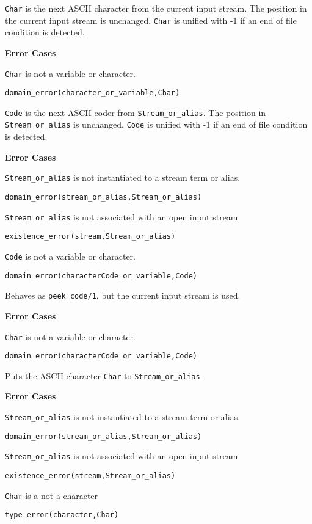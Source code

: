 \begin{description}
{\tt Char} is the next ASCII character from the current input stream.
The position in the current input stream is unchanged.  {\tt Char} is
unified with -1 if an end of file condition is detected.

{\bf Error Cases}
\bi
\item 	{\tt Char} is not a variable or character.
\bi
\item 	{\tt domain\_error(character\_or\_variable,Char)}
\ei
\ei

{\tt Code} is the next ASCII coder from {\tt Stream\_or\_alias}.
The position in {\tt Stream\_or\_alias} is unchanged.  {\tt Code} is
unified with -1 if an end of file condition is detected.

{\bf Error Cases}
\bi
\item 	{\tt Stream\_or\_alias} is not instantiated to a stream term or alias.
\bi
\item 	{\tt domain\_error(stream\_or\_alias,Stream\_or\_alias)}
\ei
\item 	{\tt Stream\_or\_alias} is not associated with an open input stream
\bi
\item 	{\tt existence\_error(stream,Stream\_or\_alias)}
\ei
\item 	{\tt Code} is not a variable or character.
\bi
\item 	{\tt domain\_error(characterCode\_or\_variable,Code)}
\ei
\ei

Behaves as {\tt peek\_code/1}, but the current input stream is used.

{\bf Error Cases}
\bi
\item 	{\tt Char} is not a variable or character.
\bi
\item 	{\tt domain\_error(characterCode\_or\_variable,Code)}
\ei
\ei


Puts the ASCII character {\tt Char} to {\tt Stream\_or\_alias}.

{\bf Error Cases}
\bi
\item 	{\tt Stream\_or\_alias} is not instantiated to a stream term or alias.
\bi
\item 	{\tt domain\_error(stream\_or\_alias,Stream\_or\_alias)}
\ei
\item 	{\tt Stream\_or\_alias} is not associated with an open input stream
\bi
\item 	{\tt existence\_error(stream,Stream\_or\_alias)}
\ei
\item 	{\tt Char} is a not a character
\bi
\item 	{\tt type\_error(character,Char)}
\ei
\ei


\end{description}
